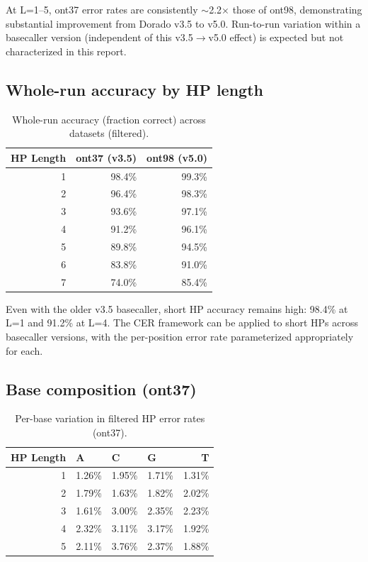 \documentclass[11pt]{article}
\begin{document}
At L=1--5, ont37 error rates are consistently ${\sim}$2.2$\times$ those of
ont98, demonstrating substantial improvement from Dorado v3.5 to v5.0.
Run-to-run variation within a basecaller version (independent of this
v3.5$\to$v5.0 effect) is expected but not characterized in this report.

\subsection{Whole-run accuracy by HP length}

\begin{table}[h]
\centering
\caption{Whole-run accuracy (fraction correct) across datasets (filtered).}
\label{tab:frac_correct_all}
\begin{tabular}{rrr}
\toprule
HP Length & ont37 (v3.5) & ont98 (v5.0) \\
\midrule
1 & 98.4\% & 99.3\% \\
2 & 96.4\% & 98.3\% \\
3 & 93.6\% & 97.1\% \\
4 & 91.2\% & 96.1\% \\
5 & 89.8\% & 94.5\% \\
6 & 83.8\% & 91.0\% \\
7 & 74.0\% & 85.4\% \\
\bottomrule
\end{tabular}
\end{table}

Even with the older v3.5 basecaller, short HP accuracy remains high: 98.4\% at
L=1 and 91.2\% at L=4. The CER framework can be applied to short HPs across
basecaller versions, with the per-position error rate parameterized
appropriately for each.

\subsection{Base composition (ont37)}

\begin{table}[h]
\centering
\caption{Per-base variation in filtered HP error rates (ont37).}
\label{tab:base_ont37}
\begin{tabular}{rlllr}
\toprule
HP Length & A & C & G & T \\
\midrule
1 & 1.26\% & 1.95\% & 1.71\% & 1.31\% \\
2 & 1.79\% & 1.63\% & 1.82\% & 2.02\% \\
3 & 1.61\% & 3.00\% & 2.35\% & 2.23\% \\
4 & 2.32\% & 3.11\% & 3.17\% & 1.92\% \\
5 & 2.11\% & 3.76\% & 2.37\% & 1.88\% \\
\bottomrule
\end{tabular}
\end{table}
\end{document}
